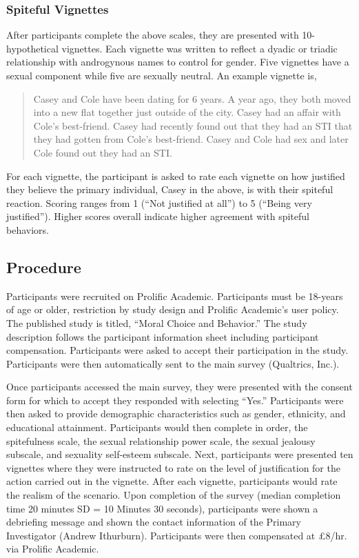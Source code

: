\documentclass[
  english,
  a4paper,floatsintext]{apa7}
\begin{document}
\hypertarget{spiteful-vignettes}{%
\subsubsection{Spiteful Vignettes}\label{spiteful-vignettes}}

After participants complete the above scales, they are presented with 10-hypothetical vignettes. Each vignette was written to reflect a dyadic or triadic relationship with androgynous names to control for gender. Five vignettes have a sexual component while five are sexually neutral. An example vignette is,

\begin{quote}
Casey and Cole have been dating for 6 years. A year ago, they both moved into a new flat together just outside of the city. Casey had an affair with Cole's best-friend. Casey had recently found out that they had an STI that they had gotten from Cole's best-friend. Casey and Cole had sex and later Cole found out they had an STI.
\end{quote}

For each vignette, the participant is asked to rate each vignette on how justified they believe the primary individual, Casey in the above, is with their spiteful reaction. Scoring ranges from 1 (``Not justified at all'') to 5 (``Being very justified''). Higher scores overall indicate higher agreement with spiteful behaviors.

\hypertarget{procedure}{%
\subsection{Procedure}\label{procedure}}

Participants were recruited on Prolific Academic. Participants must be 18-years of age or older, restriction by study design and Prolific Academic's user policy. The published study is titled, ``Moral Choice and Behavior.'' The study description follows the participant information sheet including participant compensation. Participants were asked to accept their participation in the study. Participants were then automatically sent to the main survey (Qualtrics, Inc.).

Once participants accessed the main survey, they were presented with the consent form for which to accept they responded with selecting ``Yes.'' Participants were then asked to provide demographic characteristics such as gender, ethnicity, and educational attainment. Participants would then complete in order, the spitefulness scale, the sexual relationship power scale, the sexual jealousy subscale, and sexuality self-esteem subscale. Next, participants were presented ten vignettes where they were instructed to rate on the level of justification for the action carried out in the vignette. After each vignette, participants would rate the realism of the scenario. Upon completion of the survey (median completion time 20 minutes SD = 10 Minutes 30 seconds), participants were shown a debriefing message and shown the contact information of the Primary Investigator (Andrew Ithurburn). Participants were then compensated at £8/hr. via Prolific Academic.
\end{document}
